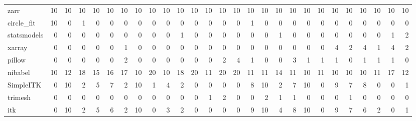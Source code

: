 \begin{tabular}{lrrrrrrrrrrrrrrrrrrrrrrrrrr}
zarr & 10 & 10 & 10 & 10 & 10 & 10 & 10 & 10 & 10 & 10 & 10 & 10 & 10 & 10 & 10 & 10 & 10 & 10 & 10 & 10 & 10 & 10 & 10 & 10 & 10 & 10 \\
circle\_fit & 10 & 0 & 1 & 0 & 0 & 0 & 0 & 0 & 0 & 0 & 0 & 0 & 0 & 0 & 1 & 0 & 0 & 0 & 0 & 0 & 0 & 0 & 0 & 0 & 0 & 0 \\
statsmodels & 0 & 0 & 0 & 0 & 0 & 0 & 0 & 0 & 0 & 1 & 0 & 0 & 0 & 0 & 0 & 0 & 1 & 0 & 0 & 0 & 0 & 0 & 0 & 0 & 1 & 2 \\
xarray & 0 & 0 & 0 & 0 & 0 & 1 & 0 & 0 & 0 & 0 & 0 & 0 & 0 & 0 & 0 & 0 & 0 & 0 & 0 & 0 & 4 & 2 & 4 & 1 & 4 & 2 \\
pillow & 0 & 0 & 0 & 0 & 0 & 2 & 0 & 0 & 0 & 0 & 0 & 0 & 2 & 4 & 1 & 0 & 0 & 3 & 1 & 1 & 1 & 0 & 1 & 1 & 1 & 0 \\
nibabel & 10 & 12 & 18 & 15 & 16 & 17 & 10 & 20 & 10 & 18 & 20 & 11 & 20 & 20 & 11 & 11 & 14 & 11 & 10 & 11 & 10 & 10 & 10 & 11 & 17 & 12 \\
SimpleITK & 0 & 10 & 2 & 5 & 7 & 2 & 10 & 1 & 4 & 2 & 0 & 0 & 0 & 0 & 8 & 10 & 2 & 7 & 10 & 0 & 9 & 7 & 8 & 0 & 0 & 1 \\
trimesh & 0 & 0 & 0 & 0 & 0 & 0 & 0 & 0 & 0 & 0 & 0 & 1 & 2 & 0 & 0 & 2 & 1 & 1 & 0 & 0 & 0 & 1 & 0 & 0 & 0 & 0 \\
itk & 0 & 10 & 2 & 5 & 6 & 2 & 10 & 0 & 3 & 2 & 0 & 0 & 0 & 0 & 9 & 10 & 4 & 8 & 10 & 0 & 9 & 7 & 6 & 2 & 0 & 1 \\
\bottomrule
\end{tabular}
